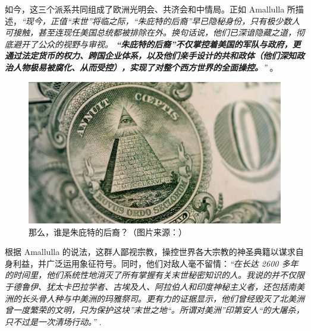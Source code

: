 \documentclass[10pt,twocolumn,letterpaper]{article}
\begin{document}
如今，这三个派系共同组成了欧洲光明会、共济会和中情局。正如 Amallulla 所描述，\textit{“现今，正值“末世”将临之际，“朱庇特的后裔”早已隐秘身份，只有极少数人可接触，甚至连现任美国总统都被排除在外。换句话说，他们已深谙隐藏之道，彻底避开了公众的视野与审视。 \textbf{“朱庇特的后裔”不仅掌控着美国的军队与政府，更通过法定货币的权力、跨国企业体系，以及他们亲手设计的共和政体（他们深知政治人物极易被腐化、从而受控），实现了对整个西方世界的全面操控。}”} \cite{33,34}。

\begin{figure}[t]
\begin{center}
   \includegraphics[width=1\linewidth]{illuminati.jpg}

\end{center}
   \caption{那么，谁是朱庇特的后裔？（图片来源：\cite{35}）}
\label{fig:10}
\label{fig:onecol}
\end{figure}

根据 Amallulla 的说法，这群人鄙视宗教，操控世界各大宗教的神圣典籍以谋求自身利益，并广泛运用象征符号。同时，他们对敌人毫不留情：\textit{“在长达 2600 多年的时间里，他们系统性地消灭了所有掌握有关末世秘密知识的人。我说的并不仅限于德鲁伊、犹太卡巴拉学者、古埃及人、阿拉伯人和印度神秘主义者，还包括南美洲的长头骨人种与中美洲的玛雅祭司。更有力的证据显示，他们曾经毁灭了北美洲曾一度繁荣的文明，只为保护这块”末世之地“。所谓对美洲”印第安人“的大屠杀，只不过是一次清场行动。”} \cite{33,34}.
\end{document}
